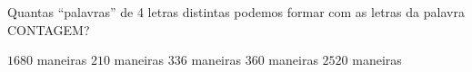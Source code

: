 Quantas ``palavras'' de 4 letras distintas podemos formar com as letras da palavra CONTAGEM?

$1680$ maneiras
$210$ maneiras
$336$ maneiras
$360$ maneiras
$2520$ maneiras



